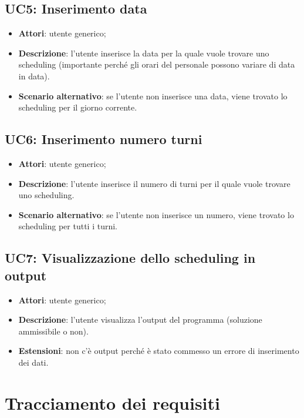\subsection{UC5: Inserimento data}
\label{UC5}
\begin{itemize}
    \item \textbf{Attori}: utente generico;
    \item \textbf{Descrizione}: l'utente inserisce la data per la quale vuole trovare uno scheduling (importante perché gli orari del personale possono variare di data in data).
    \item \textbf{Scenario alternativo}: se l'utente non inserisce una data, viene trovato lo scheduling per il giorno corrente.
\end{itemize}

\subsection{UC6: Inserimento numero turni}
\label{UC6}
\begin{itemize}
    \item \textbf{Attori}: utente generico;
    \item \textbf{Descrizione}: l'utente inserisce il numero di turni per il quale vuole trovare uno scheduling.
    \item \textbf{Scenario alternativo}: se l'utente non inserisce un numero, viene trovato lo scheduling per tutti i turni.
\end{itemize}

\subsection{UC7: Visualizzazione dello scheduling in output}
\label{UC7}
\begin{itemize}
    \item \textbf{Attori}: utente generico;
    \item \textbf{Descrizione}: l'utente visualizza l'output del programma (soluzione ammissibile o non).
    \item \textbf{Estensioni}: non c'è output perché è stato commesso un errore di inserimento dei dati.
\end{itemize}
\clearpage
\section{Tracciamento dei requisiti}

